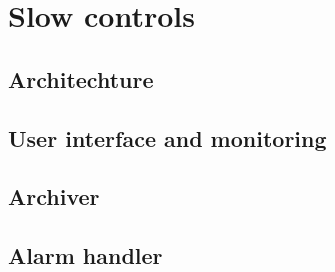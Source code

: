 
\section{Slow controls \label{sec:controls}}
\subsection{Architechture \label{sec:controlsarchitechture}}
\subsection{User interface and monitoring \label{sec:controlsinterface}}
\subsection{Archiver \label{sec:archiver}}
\subsection{Alarm handler \label{sec:alarms}}
